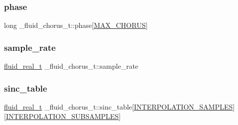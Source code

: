 \mbox{\label{struct__fluid__chorus__t_a9b180e81c16af49b532014c18b550e3c}} 
\subsubsection{\texorpdfstring{phase}{phase}}
{\footnotesize\ttfamily long \+\_\+fluid\+\_\+chorus\+\_\+t\+::phase\mbox{[}\hyperlink{fluid__chorus_8c_a3010a4cb537309a7c3204946d21a303b}{M\+A\+X\+\_\+\+C\+H\+O\+R\+US}\mbox{]}}

\mbox{\label{struct__fluid__chorus__t_acff10fb60386c6e2e0ec73263851a628}} 
\subsubsection{\texorpdfstring{sample\+\_\+rate}{sample\_rate}}
{\footnotesize\ttfamily \hyperlink{fluidsynth__priv_8h_a9e96f0917747b69cabb7c671bc693dbb}{fluid\+\_\+real\+\_\+t} \+\_\+fluid\+\_\+chorus\+\_\+t\+::sample\+\_\+rate}

\mbox{\label{struct__fluid__chorus__t_a7bf00ec81f9a6b467c739ed6502ca805}} 
\subsubsection{\texorpdfstring{sinc\+\_\+table}{sinc\_table}}
{\footnotesize\ttfamily \hyperlink{fluidsynth__priv_8h_a9e96f0917747b69cabb7c671bc693dbb}{fluid\+\_\+real\+\_\+t} \+\_\+fluid\+\_\+chorus\+\_\+t\+::sinc\+\_\+table\mbox{[}\hyperlink{fluid__chorus_8c_a0c54606433a6ee64cca093935ac9abed}{I\+N\+T\+E\+R\+P\+O\+L\+A\+T\+I\+O\+N\+\_\+\+S\+A\+M\+P\+L\+ES}\mbox{]}\mbox{[}\hyperlink{fluid__chorus_8c_a50692ae56262616da392b6377e1c960a}{I\+N\+T\+E\+R\+P\+O\+L\+A\+T\+I\+O\+N\+\_\+\+S\+U\+B\+S\+A\+M\+P\+L\+ES}\mbox{]}}

